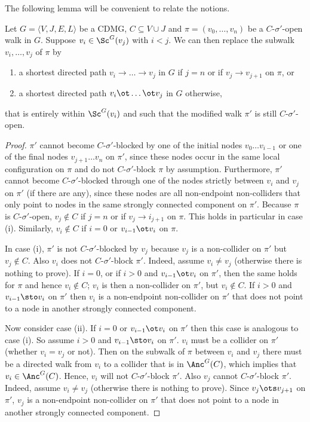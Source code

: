 The following lemma will be convenient to relate the notions.
\begin{Lem}\label{lem:replace_walk}
Let $G = \langle V, J, E, L \rangle$ be a CDMG, $C \subseteq V \cup J$ and $\pi = (v_0,\dots,v_n)$ be a $C$-$\sigma'$-open walk in $G$. 
Suppose $v_i \in \Sc^G(v_j)$ with $i < j$.
We can then replace the subwalk $v_i, \dots, v_j$ of $\pi$ by 
  \begin{enumerate}[label=(\roman*)]
    \item a shortest directed path $v_i \to \dots \to v_j$ in $G$ if $j = n$ or if $v_j \to v_{j+1}$ on $\pi$, or
    \item a shortest directed path $v_i \ot \dots \ot v_j$ in $G$ otherwise,
  \end{enumerate}
that is entirely within $\Sc^G(v_i)$ and such that the modified walk $\pi'$ is still $C$-$\sigma'$-open.
\end{Lem}
\begin{proof}
$\pi'$ cannot become $C$-$\sigma'$-blocked by one of the initial nodes $v_0 \dots v_{i-1}$ or one of the final nodes $v_{j+1} \dots v_n$ on $\pi'$, since these nodes occur in the same local configuration on $\pi$ and do not $C$-$\sigma'$-block $\pi$ by assumption.
Furthermore, $\pi'$ cannot become $C$-$\sigma'$-blocked through one of the nodes strictly between $v_i$ and $v_j$ on $\pi'$ (if there are any), since these nodes are all non-endpoint non-colliders that only point to nodes in the same strongly connected component on $\pi'$.
Because $\pi$ is $C$-$\sigma'$-open, $v_j \notin C$ if $j = n$ or if $v_j \to i_{j+1}$ on $\pi$. 
This holds in particular in case (i). 
Similarly, $v_i \notin C$ if $i = 0$ or $v_{i-1} \ot v_i$ on $\pi$.

In case (i), $\pi'$ is not $C$-$\sigma'$-blocked by $v_j$ because $v_j$ is a non-collider on $\pi'$ but $v_j \notin C$. 
Also $v_i$ does not $C$-$\sigma'$-block $\pi'$. Indeed, assume $v_i \ne v_j$ (otherwise there is nothing to prove).
If $i = 0$, or if $i > 0$ and $v_{i-1} \ot v_i$ on $\pi'$, then the same holds for $\pi$ and hence $v_i \notin C$; $v_i$ is then a non-collider on $\pi'$, but $v_i \notin C$. 
If $i > 0$ and $v_{i-1} \sto v_i$ on $\pi'$ then $v_i$ is a non-endpoint non-collider on $\pi'$ that does not point to a node in another strongly connected component.

Now consider case (ii). 
If $i = 0$ or $v_{i-1} \ot v_i$ on $\pi'$ then this case is analogous to case (i). 
So assume $i > 0$ and $v_{i-1} \sto v_i$ on $\pi'$. 
$v_i$ must be a collider on $\pi'$ (whether $v_i = v_j$ or not). 
Then on the subwalk of $\pi$ between $v_i$ and $v_j$ there must be a directed walk from $v_i$ to a collider that is in $\Anc^G(C)$, which implies that $v_i \in \Anc^G(C)$. Hence, $v_i$ will not $C$-$\sigma'$-block $\pi'$. 
Also $v_j$ cannot $C$-$\sigma'$-block $\pi'$.
Indeed, assume $v_i \ne v_j$ (otherwise there is nothing to prove). 
Since $v_j \ots v_{j+1}$ on $\pi'$, $v_j$ is a non-endpoint non-collider on $\pi'$ that does not point to a node in another strongly connected component.
\end{proof}
